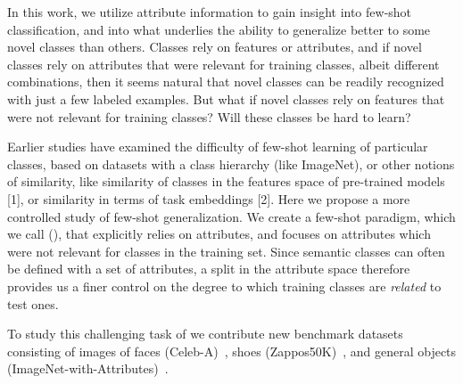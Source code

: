 In this work, we utilize attribute information to gain insight into few-shot classification, and into what underlies the ability to 
generalize better to some novel classes than others.
Classes rely on features or attributes, and if novel classes rely on attributes that were relevant for training classes, albeit different combinations, then it seems natural that novel classes
can be readily recognized with just a few labeled examples. But what if novel classes rely on features that were not relevant for training classes? Will these classes be hard to learn?

Earlier studies have examined the difficulty of few-shot learning of particular classes, based on
datasets with a class hierarchy (like ImageNet), or other notions of similarity, like similarity of classes in the features space of pre-trained models [1], or similarity in terms of task embeddings [2].
Here we propose a more controlled study of few-shot generalization. We create a few-shot paradigm, which
we call \titlelower{} (\taskname{}),
that explicitly relies on attributes, and 
focuses on attributes which were not relevant for classes in the training set.
Since semantic classes can often be defined
with a set of attributes, a split in the attribute space therefore provides us
a finer control on the degree to which training classes are \emph{related} to
test ones.


To study this challenging task of %
\taskname{} we contribute
new benchmark datasets consisting of images of faces (Celeb-A)~\citep{celeba},
shoes (Zappos50K)~\citep{zappos}, and general objects
(ImageNet-with-Attributes)~\citep{deng2009imagenet}. 

